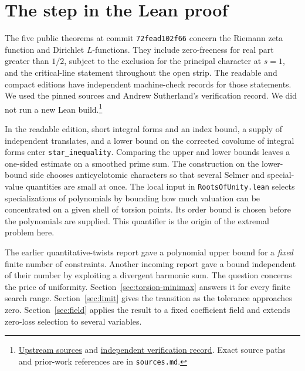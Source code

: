 \documentclass[11pt]{article}
\begin{document}
\section{The step in the Lean proof}
The five public theorems at commit \texttt{72fead102f66} concern the Riemann zeta function and Dirichlet $L$-functions. They include zero-freeness for real part greater than $1/2$, subject to the exclusion for the principal character at $s=1$, and the critical-line statement throughout the open strip. The readable and compact editions have independent machine-check records for those statements. We used the pinned sources and Andrew Sutherland's verification record. We did not run a new Lean build.\footnote{\href{https://github.com/lsernau/grh-lean/tree/72fead102f663d5c7a407964a13dc0cf9d977207}{Upstream sources} and \href{https://math.mit.edu/~drew/shortgrh/}{independent verification record}. Exact source paths and prior-work references are in \texttt{sources.md}.}
\par
In the readable edition, short integral forms and an index bound, a supply of independent translates, and a lower bound on the corrected covolume of integral forms enter \texttt{star\_inequality}. Comparing the upper and lower bounds leaves a one-sided estimate on a smoothed prime sum. The construction on the lower-bound side chooses anticyclotomic characters so that several Selmer and special-value quantities are small at once. The local input in \texttt{RootsOfUnity.lean} selects specializations of polynomials by bounding how much valuation can be concentrated on a given shell of torsion points. Its order bound is chosen before the polynomials are supplied. This quantifier is the origin of the extremal problem here.
\par
The earlier quantitative-twists report gave a polynomial upper bound for a \emph{fixed} finite number of constraints. Another incoming report gave a bound independent of their number by exploiting a divergent harmonic sum. The question concerns the price of uniformity. Section~\ref{sec:torsion-minimax} answers it for every finite search range. Section~\ref{sec:limit} gives the transition as the tolerance approaches zero. Section~\ref{sec:field} applies the result to a fixed coefficient field and extends zero-loss selection to several variables.



\end{document}
